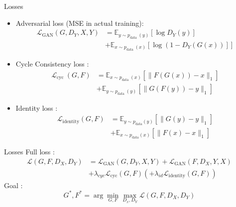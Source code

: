 \documentclass[12pt]{beamer}
\begin{document}
    \begin{frame}{Losses}
        \begin{itemize}
            \item Adversarial loss (MSE in actual training): 
                \begin{align*}
                    \mathcal{L}_{\mathrm{GAN}}\left(G, D_{Y}, X, Y\right) &= \mathbb{E}_{y \sim p_{\text {data }}(y)}\left[\log D_{Y}(y)\right]\\
                    &+ \mathbb{E}_{x \sim p_{\text {data }}(x)}\left[\log \left(1-D_{Y}(G(x))\right]\right]
                 \end{align*}
            \item Cycle Consistency loss : 
                \begin{align*}
                    \mathcal{L}_{\text {cyc }}(G, F) &= \mathbb{E}_{x \sim p_{\text {data }}(x)}\left[\|F(G(x))-x\|_{1}\right]\\
                    &+ \mathbb{E}_{y \sim p_{\text {data }}(y)}\left[\|G(F(y))-y\|_{1}\right]
                \end{align*}
            \item Identity loss :
                \begin{align*}
                    \mathcal{L}_{\text {identity}}(G, F) &=\mathbb{E}_{y \sim p_{\text {data}}(y)}\left[\|G(y)-y\|_{1}\right] \\
                    &+\mathbb{E}_{x \sim p_{\text {data}}(x)}\left[\|F(x)-x\|_{1}\right]
                \end{align*}
        \end{itemize}
    \end{frame}
    
    \begin{frame}{Losses}
        Full loss :
        \begin{align*}
            \mathcal{L}\left(G, F, D_{X}, D_{Y}\right) &= \mathcal{L}_{\mathrm{GAN}}\left(G, D_{Y}, X, Y\right) + \mathcal{L}_{\mathrm{GAN}}\left(F, D_{X}, Y, X\right)\\
            &+ \lambda_{cyc} \mathcal{L}_{\mathrm{cyc}}(G, F) (+ \lambda_{id} \mathcal{L}_{\text {identity}}(G, F))
        \end{align*}
        Goal : 
        $$G^{*}, F^{*}=\arg \min _{G, F} \max _{D_{x}, D_{Y}} \mathcal{L}\left(G, F, D_{X}, D_{Y}\right)$$
    \end{frame}
    
\end{document}
